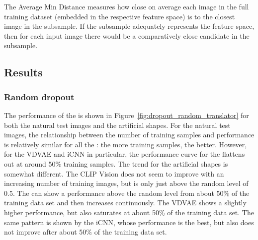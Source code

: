 The Average Min Distance measures how close on average each image in the full training dataset (embedded in the respective feature space) is to the closest image in the subsample. If the subsample adequately represents the feature space, then for each input image there would be a comparatively close candidate in the subsample. 

\subsection{Results}



\subsubsection{Random dropout}

The performance of the  is shown in Figure~\ref{fig:dropout_random_translator} for both the natural test images and the artificial shapes. For the natural test images, the relationship between the number of training samples and performance is relatively similar for all the : the more training samples, the better. However, for the VDVAE and iCNN in particular, the performance curve for the  flattens out at around 50\% training samples. The trend for the artificial shapes is somewhat different. The CLIP Vision  does not seem to improve with an increasing number of training images, but is only just above the random level of 0.5. The   can show a performance above the random level from about 50\% of the training data set and then increases continuously. The VDVAE  shows a slightly higher performance, but also saturates at about 50\% of the training data set. The same pattern is shown by the iCNN, whose performance is the best, but also does not improve after about 50\% of the training data set. 


